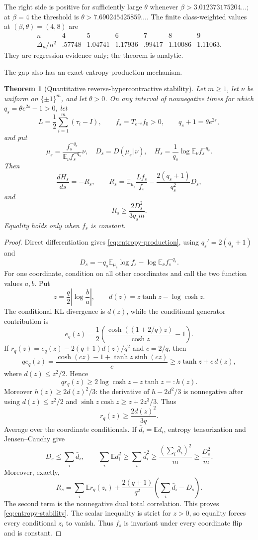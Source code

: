 \documentclass[11pt]{article}
\newtheorem{theorem}{Theorem}
\newcommand{\E}{\mathbb E}
\begin{document}
The right side is positive for sufficiently large $\theta$ whenever
$\beta>3.012373175204\ldots$; at $\beta=4$ the threshold is
$\theta>7.690245425859\ldots$.  The finite class-weighted values at
$(\beta,\theta)=(4,8)$ are
\[
\begin{array}{c|rrrrrr}
n&4&5&6&7&8&9\\ \hline
\Delta_n/n^2&.57748&1.04741&1.17936&.99417&1.10086&1.11063.
\end{array}
\]
They are regression evidence only; the theorem is analytic.

The gap also has an exact entropy-production mechanism.

\begin{theorem}[Quantitative reverse-hypercontractive stability]
\label{thm:transport-stability}
Let $m\ge1$, let $\nu$ be uniform on $\{\pm1\}^m$, and let $\theta>0$.
On any interval of nonnegative times for which
$q_s=\theta e^{2s}-1>0$, let
\[
 L=\frac12\sum_{i=1}^m(\tau_i-I),\qquad
 f_s=T_{e^{-s}}f_0>0,\qquad q_s+1=\theta e^{2s},
\]
and put
\[
 \mu_s=\frac{f_s^{-q_s}}{\E_\nu f_s^{-q_s}}\nu,
 \quad D_s=D(\mu_s\Vert\nu),
 \quad H_s=\frac1{q_s}\log\E_\nu f_s^{-q_s}.
\]
Then
\begin{equation}
 \frac{dH_s}{ds}=-R_s,\qquad
 R_s=\E_{\mu_s}\frac{Lf_s}{f_s}
 -\frac{2(q_s+1)}{q_s^2}D_s,
 \label{eq:entropy-production}
\end{equation}
and
\begin{equation}
 R_s\ge\frac{2D_s^2}{3q_s m}.
 \label{eq:entropy-stability}
\end{equation}
Equality holds only when $f_s$ is constant.
\end{theorem}

\begin{proof}
Direct differentiation gives \eqref{eq:entropy-production}, using
$q_s'=2(q_s+1)$ and
\[
 D_s=-q_s\E_{\mu_s}\log f_s-\log\E_\nu f_s^{-q_s}.
\]
For one coordinate, condition on all other coordinates and call the two
function values $a,b$.  Put
\[
 z=\frac q2\left|\log\frac ba\right|,\qquad
 d(z)=z\tanh z-\log\cosh z.
\]
The conditional KL divergence is $d(z)$, while the conditional generator
contribution is
\[
 e_q(z)=\frac12\left(
 \frac{\cosh((1+2/q)z)}{\cosh z}-1\right).
\]
If $r_q(z)=e_q(z)-2(q+1)d(z)/q^2$ and $c=2/q$, then
\[
 qe_q(z)=\frac{\cosh(cz)-1+\tanh z\sinh(cz)}c
 \ge z\tanh z+c\,d(z),
\]
where $d(z)\le z^2/2$.  Hence
\[
 qr_q(z)\ge2\log\cosh z-z\tanh z=:h(z).
\]
Moreover $h(z)\ge2d(z)^2/3$: the derivative of $h-2d^2/3$ is nonnegative
after using $d(z)\le z^2/2$ and
$\sinh z\cosh z\ge z+2z^3/3$.  Thus
\[
 r_q(z)\ge\frac{2d(z)^2}{3q}.
\]
Average over the coordinate conditionals.  If
$\bar d_i=\E d_i$, entropy tensorization and Jensen--Cauchy give
\[
 D_s\le\sum_i\bar d_i,\qquad
 \sum_i\E d_i^2\ge\sum_i\bar d_i^2
 \ge\frac{(\sum_i\bar d_i)^2}{m}\ge\frac{D_s^2}{m}.
\]
Moreover, exactly,
\[
 R_s=\sum_i\E r_q(z_i)
 +\frac{2(q+1)}{q^2}\left(\sum_i\bar d_i-D_s\right).
\]
The second term is the nonnegative dual total correlation.  This proves
\eqref{eq:entropy-stability}.  The scalar inequality is strict for $z>0$,
so equality forces every conditional $z_i$ to vanish.  Thus $f_s$ is
invariant under every coordinate flip and is constant.
\end{proof}
\end{document}
